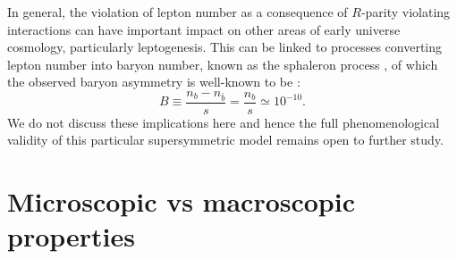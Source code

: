 In general, the violation of lepton number as a consequence of $R$-parity violating interactions can have important impact on other areas of early universe cosmology, particularly leptogenesis. This can be linked to processes converting lepton number into baryon number, known as the sphaleron process \cite{RN908}, of which the observed baryon asymmetry is well-known to be \cite{RN909}:
\begin{equation}
	B \equiv \frac{n_b-n_{\bar{b}}}{s} = \frac{n_b}{s} \simeq 10^{-10}.
\end{equation}
 We do not discuss these implications here and hence the full phenomenological validity of this particular supersymmetric model remains open to further study.

\section{Microscopic vs macroscopic properties}

